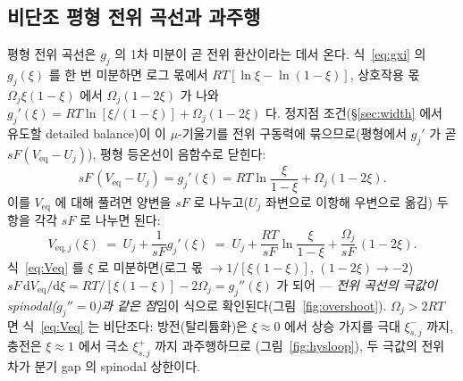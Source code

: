 \documentclass[11pt,a4paper]{article}
\newcommand{\dd}{\mathrm{d}}
\newcommand{\eq}{\mathrm{eq}}
\begin{document}
\subsection{비단조 평형 전위 곡선과 과주행}
평형 전위 곡선은 $g_j$ 의 1차 미분이 곧 전위 환산이라는 데서 온다. 식~\eqref{eq:gxi} 의 $g_j(\xi)$ 를 한 번 미분하면
로그 몫에서 $RT[\ln\xi-\ln(1-\xi)]$, 상호작용 몫 $\Omega_j\xi(1-\xi)$ 에서 $\Omega_j(1-2\xi)$ 가 나와
$g_j'(\xi)=RT\ln[\xi/(1-\xi)]+\Omega_j(1-2\xi)$ 다. 정지점 조건(\S\ref{sec:width} 에서 유도할 detailed balance)이 이
$\mu$-기울기를 전위 구동력에 묶으므로(평형에서 $g_j'$ 가 곧 $sF(V_\eq-U_j)$), 평형 등온선이 음함수로 닫힌다:
\begin{equation}
sF\,(V_\eq-U_j)=g_j'(\xi)=RT\ln\frac{\xi}{1-\xi}+\Omega_j(1-2\xi).
\label{eq:isotherm}
\end{equation}
이를 $V_\eq$ 에 대해 풀려면 양변을 $sF$ 로 나누고($U_j$ 좌변으로 이항해 우변으로 옮김) 두 항을 각각 $sF$ 로 나누면 된다:
\begin{equation}
V_{\eq,j}(\xi)\;=\;U_j+\frac{1}{sF}g_j'(\xi)\;=\;U_j+\frac{RT}{sF}\ln\frac{\xi}{1-\xi}+\frac{\Omega_j}{sF}\,(1-2\xi).
\label{eq:Veq}
\end{equation}
식~\eqref{eq:Veq} 를 $\xi$ 로 미분하면(로그 몫 $\to1/[\xi(1-\xi)]$, $(1-2\xi)\to-2$) $sF\,\dd V_\eq/\dd\xi=
RT/[\xi(1-\xi)]-2\Omega_j=g_j''(\xi)$ 가 되어 — \emph{전위 곡선의 극값이 spinodal($g_j''=0$)과 같은 점}임이 식으로
확인된다(그림~\ref{fig:overshoot}). $\Omega_j>2RT$ 면 식~\eqref{eq:Veq} 는 비단조다: 방전(탈리튬화)은 $\xi\!\approx\!0$
에서 상승 가지를 극대 $\xi_{s,j}^-$ 까지, 충전은 $\xi\!\approx\!1$ 에서 극소 $\xi_{s,j}^+$ 까지 과주행하므로
(그림~\ref{fig:hysloop}), 두 극값의 전위 차가 분기 gap 의 spinodal 상한이다.
\end{document}
